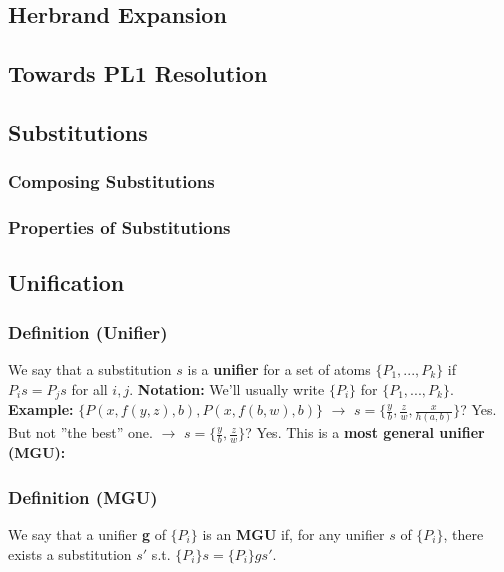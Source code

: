 \documentclass[conference, a4paper]{styles/acmsiggraph}
\begin{document}
    \subsection{Herbrand Expansion}
    \subsection{Towards PL1 Resolution}
    \subsection{Substitutions}
        \subsubsection{Composing Substitutions}
        \subsubsection{Properties of Substitutions}
    
    
    
    
    
    
    
    
    \subsection{Unification}
        \subsubsection{Definition (Unifier)}
            We say that a substitution $s$ is a \textbf{unifier} for a set of atoms $\{P_1,...,P_k\}$ if $P_is = P_js$ for all $i,j$.\newline
            \textbf{Notation:} We'll usually write $\{P_i\}$ for $\{P_1,...,P_k\}$.\newline
            \textbf{Example:} $\{P(x,f(y,z),b),P(x,f(b,w),b)\}$\newline
                $\rightarrow$ $s = \{\frac{y}{b},\frac{z}{w},\frac{x}{h(a,b)}\}$? Yes. But not ''the best'' one.\newline
                $\rightarrow$ $s = \{\frac{y}{b},\frac{z}{w}\}$? Yes. This is a \textbf{most general unifier (MGU):}
            
        \subsubsection{Definition (MGU)}
            We say that a unifier \textbf{g} of $\{P_i\}$ is an \textbf{MGU} if, for any unifier $s$ of $\{P_i\}$, there exists a substitution $s'$ s.t. $\{P_i\}s = \{P_i\}gs'$.
        
\end{document}
